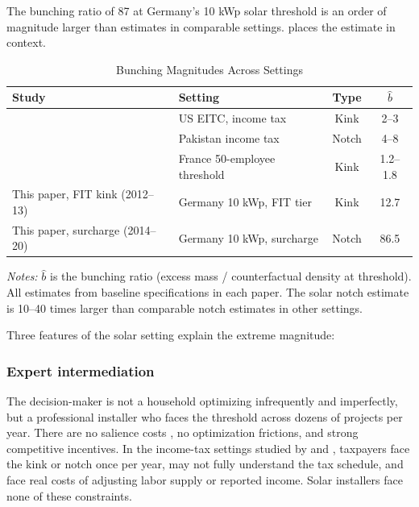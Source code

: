 \documentclass[12pt]{article}
\begin{document}
The bunching ratio of 87 at Germany's 10 kWp solar threshold is an order of magnitude larger than estimates in comparable settings.  places the estimate in context.

\begin{table}[t]
\centering
\caption{Bunching Magnitudes Across Settings}
\label{tab:benchmarks}
\begin{tabular}{llcc}
\toprule
Study & Setting & Type & $\hat{b}$ \\
\midrule
\citet{saez2010taxpayers} & US EITC, income tax & Kink & 2--3 \\
\citet{kleven2013using} & Pakistan income tax & Notch & 4--8 \\
\citet{garicano2016firm} & France 50-employee threshold & Kink & 1.2--1.8 \\
This paper, FIT kink (2012--13) & Germany 10 kWp, FIT tier & Kink & 12.7 \\
This paper, surcharge (2014--20) & Germany 10 kWp, surcharge & Notch & 86.5 \\
\bottomrule
\end{tabular}

\vspace{0.5em}
\begin{flushleft}\small \textit{Notes:} $\hat{b}$ is the bunching ratio (excess mass / counterfactual density at threshold). All estimates from baseline specifications in each paper. The solar notch estimate is 10--40 times larger than comparable notch estimates in other settings.\end{flushleft}
\end{table}

Three features of the solar setting explain the extreme magnitude:

\subsubsection*{Expert intermediation} The decision-maker is not a household optimizing infrequently and imperfectly, but a professional installer who faces the threshold across dozens of projects per year. There are no salience costs \citep{chetty2009salience}, no optimization frictions, and strong competitive incentives. In the income-tax settings studied by \citet{saez2010taxpayers} and \citet{kleven2013using}, taxpayers face the kink or notch once per year, may not fully understand the tax schedule, and face real costs of adjusting labor supply or reported income. Solar installers face none of these constraints.
\end{document}
